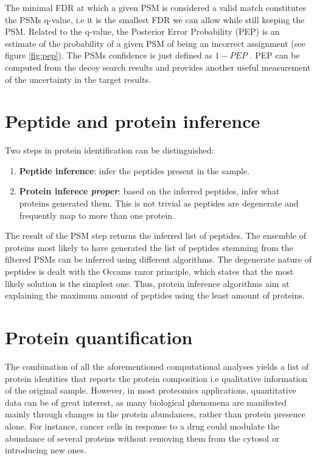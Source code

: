 \documentclass[thesis]{subfiles}
\begin{document}
The minimal FDR at which a given PSM is considered a valid match constitutes the PSM\textquotesingle s q-value, i.e it is the smallest FDR we can allow while still keeping the PSM. Related to the q-value, the Posterior Error Probability (PEP) is an estimate of the probability of a given PSM of being an incorrect assignment (see figure \ref{fig:pep}). The PSM\textquotesingle s confidence is just defined as $1-PEP$ \cite{Nesvizhskii2010}. PEP can be computed from the decoy search results and provides another useful measurement of the uncertainty in the target results.




\section{Peptide and protein inference}
\label{sec:inference}

Two steps in protein identification can be distinguished:

\begin{enumerate}

\item \textbf{Peptide inference}: infer the peptides present in the sample.
\item \textbf{Protein inferece \textit{proper}}: based on the inferred peptides, infer what proteins generated them. This is not trivial as peptides are degenerate and frequently map to more than one protein.
\end{enumerate}

The result of the PSM step returns the inferred list of peptides. The ensemble of proteins most likely to have generated the list of peptides stemming from the filtered PSMs can be inferred using different algorithms. The degenerate nature of peptides is dealt with the Occam\textquotesingle s razor principle, which states that the most likely solution is the simplest one. Thus, protein inference algorithms aim at explaining the maximum amount of peptides using the least amount of proteins.

\section{Protein quantification}
\label{sec:quantification}

The combination of all the aforementioned computational analyses yields a list of protein identities that reports the protein composition i.e qualitative information of the original sample. However, in most proteomics applications, quantitative data can be of great interest, as many biological phenomena are manifested mainly through changes in the protein abundances, rather than protein presence alone. For instance, cancer cells in response to a drug could modulate the abundance of several proteins without removing them from the cytosol or introducing new ones.
\end{document}
